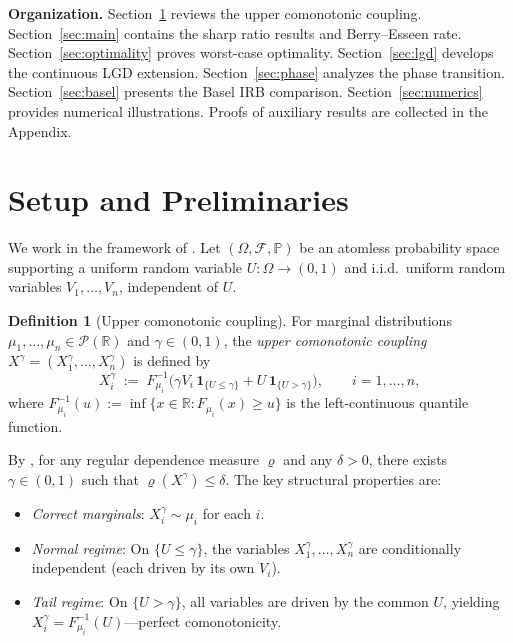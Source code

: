 \documentclass[11pt]{article}
\theoremstyle{definition}
\newtheorem{definition}[theorem]{Definition}
\newcommand{\R}{\mathbb{R}}
\newcommand{\PP}{\mathbb{P}}
\newcommand{\1}{\mathbf{1}}
\newcommand{\calP}{\mathcal{P}}
\newcommand{\calF}{\mathcal{F}}
\begin{document}
\medskip

\noindent\textbf{Organization.} Section~\ref{sec:setup} reviews the upper comonotonic coupling. Section~\ref{sec:main} contains the sharp ratio results and Berry--Esseen rate. Section~\ref{sec:optimality} proves worst-case optimality. Section~\ref{sec:lgd} develops the continuous LGD extension. Section~\ref{sec:phase} analyzes the phase transition. Section~\ref{sec:basel} presents the Basel IRB comparison. Section~\ref{sec:numerics} provides numerical illustrations. Proofs of auxiliary results are collected in the Appendix.

\section{Setup and Preliminaries}\label{sec:setup}

We work in the framework of \citet{DVNSupper}. Let $(\Omega, \calF, \PP)$ be an atomless probability space supporting a uniform random variable $U \colon \Omega \to (0,1)$ and i.i.d.\ uniform random variables $V_1, \ldots, V_n$, independent of $U$.

\begin{definition}[Upper comonotonic coupling]\label{def:uc_coupling}
For marginal distributions $\mu_1, \ldots, \mu_n \in \calP(\R)$ and $\gamma \in (0,1)$, the \emph{upper comonotonic coupling} $X^\gamma = (X_1^\gamma, \ldots, X_n^\gamma)$ is defined by
\begin{equation}\label{eq:uc_coupling}
  X_i^\gamma \;:=\; F_{\mu_i}^{-1}\!\bigl(\gamma V_i\,\1_{\{U \leq \gamma\}} + U\,\1_{\{U > \gamma\}}\bigr), \qquad i = 1, \ldots, n,
\end{equation}
where $F_{\mu_i}^{-1}(u) := \inf\{x \in \R : F_{\mu_i}(x) \geq u\}$ is the left-continuous quantile function.
\end{definition}

By \citet[Theorem~5]{DVNSupper}, for any regular dependence measure $\varrho$ and any $\delta > 0$, there exists $\gamma \in (0,1)$ such that $\varrho(X^\gamma) \leq \delta$. The key structural properties are:
\begin{itemize}
  \item \emph{Correct marginals}: $X_i^\gamma \sim \mu_i$ for each $i$.
  \item \emph{Normal regime}: On $\{U \leq \gamma\}$, the variables $X_1^\gamma, \ldots, X_n^\gamma$ are conditionally independent (each driven by its own $V_i$).
  \item \emph{Tail regime}: On $\{U > \gamma\}$, all variables are driven by the common $U$, yielding $X_i^\gamma = F_{\mu_i}^{-1}(U)$---perfect comonotonicity.
\end{itemize}
\end{document}
